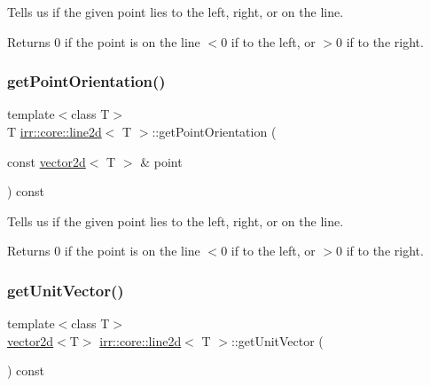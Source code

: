 Tells us if the given point lies to the left, right, or on the line. 

\begin{DoxyReturn}{Returns}
0 if the point is on the line $<$0 if to the left, or $>$0 if to the right. 
\end{DoxyReturn}
\mbox{\label{classirr_1_1core_1_1line2d_a85405d08c6e3ea55cdb39b60484f7275}} 
\subsubsection{\texorpdfstring{get\+Point\+Orientation()}{getPointOrientation()}\hspace{0.1cm}{\footnotesize\ttfamily [2/2]}}
{\footnotesize\ttfamily template$<$class T$>$ \\
T \hyperlink{classirr_1_1core_1_1line2d}{irr\+::core\+::line2d}$<$ T $>$\+::get\+Point\+Orientation (\begin{DoxyParamCaption}\item[{const \hyperlink{classirr_1_1core_1_1vector2d}{vector2d}$<$ T $>$ \&}]{point }\end{DoxyParamCaption}) const\hspace{0.3cm}{\ttfamily [inline]}}



Tells us if the given point lies to the left, right, or on the line. 

\begin{DoxyReturn}{Returns}
0 if the point is on the line $<$0 if to the left, or $>$0 if to the right. 
\end{DoxyReturn}
\mbox{\label{classirr_1_1core_1_1line2d_ae3f1a52b3057168c41d283d100d13c79}} 
\subsubsection{\texorpdfstring{get\+Unit\+Vector()}{getUnitVector()}\hspace{0.1cm}{\footnotesize\ttfamily [1/2]}}
{\footnotesize\ttfamily template$<$class T$>$ \\
\hyperlink{classirr_1_1core_1_1vector2d}{vector2d}$<$T$>$ \hyperlink{classirr_1_1core_1_1line2d}{irr\+::core\+::line2d}$<$ T $>$\+::get\+Unit\+Vector (\begin{DoxyParamCaption}{ }\end{DoxyParamCaption}) const\hspace{0.3cm}{\ttfamily [inline]}}




